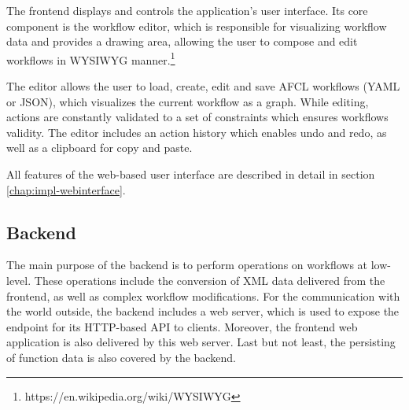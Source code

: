 \documentclass[a4paper,top=25mm,bottom=25mm,12pt,pdftex,halfparskip,twoside,bibtotoc,numbers=noenddot]{scrbook}
\begin{document}


The frontend displays and controls the application's user interface. Its core component is the workflow editor, which is responsible for visualizing workflow data and provides a drawing area, allowing the user to compose and edit workflows in WYSIWYG manner.\footnote{https://en.wikipedia.org/wiki/WYSIWYG}

The editor allows the user to load, create, edit and save AFCL workflows (YAML or JSON), which visualizes the current workflow as a graph. While editing, actions are constantly validated to a set of constraints which ensures workflows validity. The editor includes an action history which enables undo and redo, as well as a clipboard for copy and paste.

All features of the web-based user interface are described in detail in section \ref{chap:impl-webinterface}.




\subsection{Backend}

The main purpose of the backend is to perform operations on workflows at low-level. These operations include the conversion of XML data delivered from the frontend, as well as complex workflow modifications.
For the communication with the world outside, the backend includes a web server, which is used to expose the endpoint for its HTTP-based API to clients. Moreover, the frontend web application is also delivered by this web server. 
Last but not least, the persisting of function data is also covered by the backend.


\end{document}
